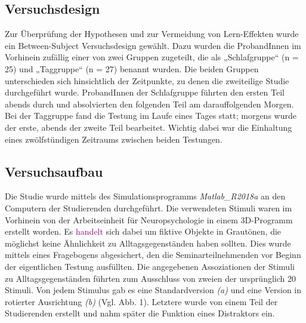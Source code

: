 \subsection{Versuchsdesign}
Zur Überprüfung der Hypothesen und zur Vermeidung von Lern-Effekten wurde ein Between-Subject Versuchsdesign gewählt. Dazu wurden die ProbandInnen im Vorhinein zufällig einer von zwei Gruppen zugeteilt, die als „Schlafgruppe“ (n = 25) und „Taggruppe“ (n = 27) benannt wurden. Die beiden Gruppen unterschieden sich hinsichtlich der Zeitpunkte, zu denen die zweiteilige Studie durchgeführt wurde. ProbandInnen der Schlafgruppe führten den ersten Teil abends durch und absolvierten den folgenden Teil am darauffolgenden Morgen. Bei der Taggruppe fand die Testung im Laufe eines Tages statt; morgens wurde der erste, abends der zweite Teil bearbeitet. Wichtig dabei war die Einhaltung eines zwölfstündigen Zeitraums zwischen beiden Testungen.

\subsection{Versuchsaufbau}
Die Studie wurde mittels des Simulationsprogramms \textit{Matlab\_R2018a} an den Computern der Studierenden durchgeführt. Die verwendeten Stimuli waren im Vorhinein von der Arbeitseinheit für Neuropsychologie in einem 3D-Programm  erstellt worden. Es \textcolor{purple}{handelt} sich dabei um fiktive Objekte in Grautönen, die möglichst keine Ähnlichkeit zu Alltagsgegenständen haben sollten. Dies wurde mittels eines Fragebogens abgesichert, den die Seminarteilnehmenden vor Beginn der eigentlichen Testung ausfüllten. Die angegebenen Assoziationen der Stimuli zu Alltagsgegenständen führten zum Ausschluss von zweien der ursprünglich 20 Stimuli. Von jedem Stimulus gab es eine Standardversion \textit{(a)} und eine Version in rotierter Ausrichtung \textit{(b)} (Vgl. Abb. 1). Letztere wurde von einem Teil der Studierenden erstellt und nahm später die Funktion eines Distraktors ein.

